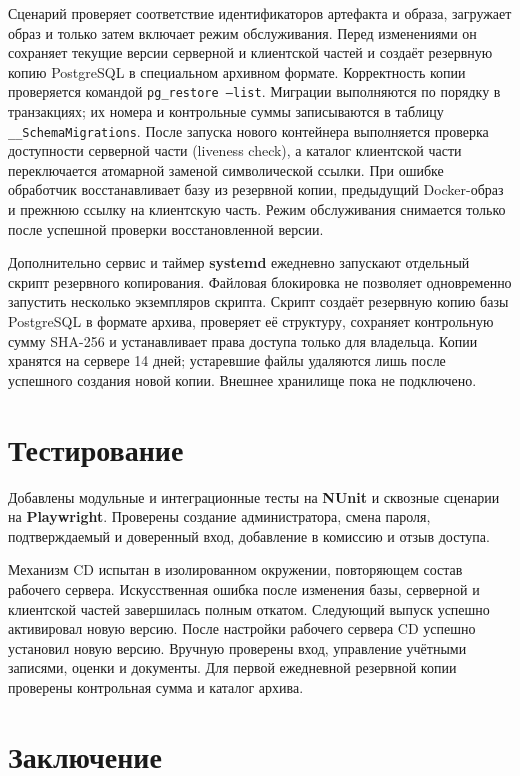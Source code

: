 \documentclass[a4paper]{article}
\begin{document}
Сценарий проверяет соответствие идентификаторов артефакта и образа, загружает
образ и только затем включает режим обслуживания. Перед изменениями он
сохраняет текущие версии серверной и клиентской частей и создаёт резервную копию
PostgreSQL в специальном архивном формате. Корректность копии проверяется командой
\texttt{pg\_restore --list}. Миграции выполняются по порядку в транзакциях;
их номера и контрольные суммы записываются в таблицу
\texttt{\_\_SchemaMigrations}. После запуска нового контейнера выполняется
проверка доступности серверной части (liveness check), а каталог клиентской
части переключается атомарной заменой символической ссылки. При ошибке
обработчик восстанавливает базу из резервной копии, предыдущий Docker-образ и
прежнюю ссылку на клиентскую часть. Режим обслуживания снимается только после
успешной проверки восстановленной версии.

Дополнительно сервис и таймер \textbf{systemd} ежедневно запускают отдельный
скрипт резервного копирования. Файловая блокировка не позволяет одновременно
запустить несколько экземпляров скрипта. Скрипт создаёт резервную копию базы
PostgreSQL в формате архива, проверяет её структуру, сохраняет контрольную сумму
SHA-256 и устанавливает права доступа только для владельца. Копии хранятся на
сервере 14 дней; устаревшие файлы удаляются лишь после успешного создания новой
копии. Внешнее хранилище пока не подключено.


\section{Тестирование}

Добавлены модульные и интеграционные тесты на \textbf{NUnit} и сквозные
сценарии на \textbf{Playwright}. Проверены создание администратора, смена
пароля, подтверждаемый и доверенный вход, добавление в комиссию и отзыв доступа.

Механизм CD испытан в изолированном окружении, повторяющем состав рабочего
сервера. Искусственная ошибка после изменения базы, серверной и клиентской частей
завершилась полным откатом. Следующий выпуск успешно активировал новую версию.
После настройки рабочего сервера CD успешно установил новую версию.
Вручную проверены вход, управление учётными записями, оценки и документы.
Для первой ежедневной резервной копии проверены контрольная сумма и каталог архива.


\section{Заключение}
\end{document}
